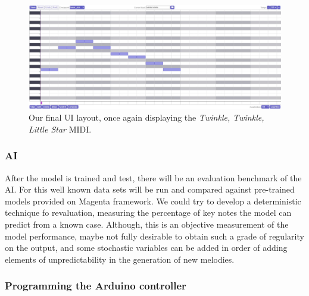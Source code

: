 \begin{figure}[h!]
  \centering
  \includegraphics[width=\linewidth]{image/FinalUI.png}
  \caption{Our final UI layout, once again displaying the \textit{Twinkle, Twinkle, Little Star} MIDI.}
  \label{fig:soundtrap}
\end{figure}

\subsubsection{AI}

After the model is trained and test, there will be an evaluation benchmark of the AI. For
this well known data sets will be run and compared against pre-trained models provided on
Magenta framework. We could try to develop a deterministic technique fo revaluation,
measuring the percentage of key notes the model can predict from a known case. Although,
this is an objective measurement of the model performance, maybe not fully desirable to
obtain such a grade of regularity on the output, and some stochastic variables can be
added in order of adding elements of unpredictability in the generation of new melodies.

\subsubsection{Programming the Arduino controller}
